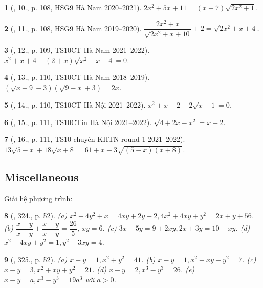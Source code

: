 \documentclass{article}
\newtheorem{baitoan}{}
\begin{document}
\begin{baitoan}[\cite{Lam_An_Tuan_Toan_9_dai_so}, 10., p. 108, HSG9 Hà Nam 2020--2021]
	$2x^2 + 5x + 11 = (x + 7)\sqrt{2x^2 + 1}$.
\end{baitoan}

\begin{baitoan}[\cite{Lam_An_Tuan_Toan_9_dai_so}, 11., p. 108, HSG9 Hà Nam 2019--2020]
	$\dfrac{2x^2 + x}{\sqrt{2x^2 + x + 10}} + 2 = \sqrt{2x^2 + x + 4}$.
\end{baitoan}

\begin{baitoan}[\cite{Lam_An_Tuan_Toan_9_dai_so}, 12., p. 109, TS10CT Hà Nam 2021--2022]
	$x^2 + x + 4 - (2 + x)\sqrt{x^2 - x + 4}  = 0$.
\end{baitoan}

\begin{baitoan}[\cite{Lam_An_Tuan_Toan_9_dai_so}, 13., p. 110, TS10CT Hà Nam 2018--2019]
	$(\sqrt{x + 9} - 3)(\sqrt{9 - x} + 3) = 2x$.
\end{baitoan}

\begin{baitoan}[\cite{Lam_An_Tuan_Toan_9_dai_so}, 14., p. 110, TS10CT Hà Nội 2021--2022]
	$x^2 + x + 2 - 2\sqrt{x + 1} = 0$.
\end{baitoan}

\begin{baitoan}[\cite{Lam_An_Tuan_Toan_9_dai_so}, 15., p. 111, TS10CTin Hà Nội 2021--2022]
	$\sqrt{4 + 2x - x^2} = x - 2$.
\end{baitoan}

\begin{baitoan}[\cite{Lam_An_Tuan_Toan_9_dai_so}, 16., p. 111, TS10 chuyên KHTN round 1 2021--2022]
	$13\sqrt{5 - x} + 18\sqrt{x + 8} = 61 + x + 3\sqrt{(5 - x)(x + 8)}$.
\end{baitoan}

\subsection{Miscellaneous}
Giải hệ phương trình:

\begin{baitoan}[\cite{Binh_Toan_9_tap_2}, 324., p. 52]
	(a) $x^2 + 4y^2 + x = 4xy + 2y + 2,4x^2 + 4xy + y^2 = 2x + y + 56$. (b) $\dfrac{x + y}{x - y} + \dfrac{x - y}{x + y} = \dfrac{26}{5}$, $xy = 6$. (c) $3x + 5y = 9 + 2xy,2x + 3y = 10 - xy$. (d) $x^2 - 4xy + y^2 = 1,y^2 - 3xy = 4$.
\end{baitoan}

\begin{baitoan}[\cite{Binh_Toan_9_tap_2}, 325., p. 52]
	(a) $x + y = 1,x^2 + y^2 = 41$. (b) $x - y = 1,x^2 - xy + y^2 = 7$. (c) $x - y = 3,x^2 + xy + y^2 = 21$. (d) $x - y = 2,x^3 - y^3 = 26$. (e) $x - y = a,x^3 - y^3 = 19a^3$ với $a > 0$.
\end{baitoan}
\end{document}
